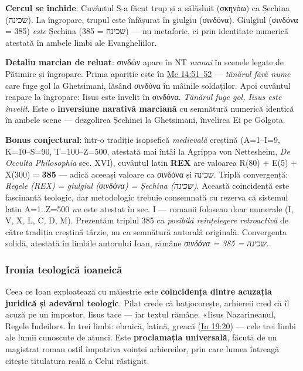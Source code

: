 \documentclass[12pt,a4paper,twoside,openany]{book}
\begin{document}
\textbf{Cercul se închide}: Cuvântul S-a făcut trup și a sălășluit (σκηνόω) ca Șechina (שכינה). La îngropare, trupul este înfășurat în giulgiu (σινδόνα). Giulgiul (σινδόνα = 385) \textit{este} Șechina (שכינה = 385) — nu metaforic, ci prin identitate numerică atestată în ambele limbi ale Evangheliilor.

\textbf{Detaliu marcian de reluat}: σινδών apare în NT \textit{numai} în scenele legate de Pătimire și îngropare. Prima apariție este în \href{https://bibliaortodoxa.ro/carte.php?id=53\&cap=14\#51}{Mc 14:51--52} — \textit{tânărul fără nume} care fuge gol la Ghetsimani, lăsând σινδόνα în mâinile soldaților. Apoi cuvântul reapare la îngropare: Iisus este învelit în σινδόνα. \textit{Tânărul fuge gol, Iisus este învelit}. Este o \textbf{inversiune narativă marciană} cu semnătură numerică identică în ambele scene — dezgolirea Șechinei la Ghetsimani, învelirea Ei pe Golgota.

\textbf{Bonus conjectural}: într-o tradiție isopsefică \textit{medievală} creștină (A=1--I=9, K=10--S=90, T=100--Z=500, atestată mai întâi la Agrippa von Nettesheim, \textit{De Occulta Philosophia} sec. XVI), cuvântul latin \textbf{REX} are valoarea R(80) + E(5) + X(300) = \textbf{385} — adică aceeași valoare ca σινδόνα și שכינה. Triplă convergență: \textit{Regele (REX) = giulgiul (σινδόνα) = Șechina (שכינה)}. Această coincidență este fascinantă teologic, dar metodologic trebuie consemnată cu rezerva că sistemul latin A=1..Z=500 \textit{nu} este atestat în sec. I — romanii foloseau doar numerale (I, V, X, L, C, D, M). Prezentăm triplul 385 ca \textit{posibilă reînțelegere retroactivă} de către tradiția creștină târzie, nu ca semnătură autorală originală. Convergența solidă, atestată în limbile autorului Ioan, rămâne \textit{σινδόνα = שכינה = 385}.

\subsubsection*{Ironia teologică ioaneică}

Ceea ce Ioan exploatează cu măiestrie este \textbf{coincidența dintre acuzația juridică și adevărul teologic}. Pilat crede că batjocorește, arhiereii cred că îl acuză pe un impostor, Iisus tace — iar textul rămâne. «Iisus Nazarineanul, Regele Iudeilor». În trei limbi: ebraică, latină, greacă (\href{https://bibliaortodoxa.ro/carte.php?id=35\&cap=19\#20}{In 19:20}) — cele trei limbi ale lumii cunoscute de atunci. Este \textbf{proclamația universală}, făcută de un magistrat roman ostil împotriva voinței arhiereilor, prin care lumea întreagă citește titulatura reală a Celui răstignit.
\end{document}
